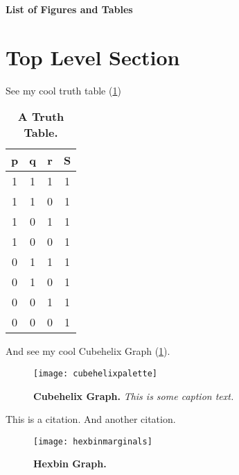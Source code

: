 \documentclass[12pt]{article}
\makeatletter
\newcommand \Dotfill {\leavevmode \cleaders \hb@xt@ .8em{\hss .\hss }\hfill \kern \z@}
\newcommand{\titlepagefigure}{Title Page Figure}
\newif\iftitlefigure
\makeatother
\begin{document}
\begin{center}
{\fontsize{18pt}{24pt}\bfseries List of Figures and Tables}
\end{center}
\iftitlefigure
	{\hspace{6mm}\fontsize{14pt}{15pt}\hyperref[fig:titlepage]{Figure \thefigure. \titlepagefigure} \Dotfill Title Page}
\fi

\listoffigures
\listoftables
\clearpage

\setcounter{page}{1}

\section{Top Level Section}
\blindmathtrue
\blindtext

See my cool truth table (\ref{tab:truthy})

\begin{table} [h!]
\caption[Table \thetable. Truth Table]{ \textbf{A Truth Table.} } 
\begin{tabular} {c c c | c}
p & q & r & S\\ \hline
1 & 1 & 1 & 1\\
1 & 1 & 0 & 1\\
1 & 0 & 1 & 1\\
1 & 0 & 0 & 1\\
0 & 1 & 1 & 1\\
0 & 1 & 0 & 1\\
0 & 0 & 1 & 1\\
0 & 0 & 0 & 1\\
\end{tabular}
\label{tab:truthy}
\end{table}

\blindtext

And see my cool Cubehelix Graph (\ref{fig:cubehelix}).

\begin{figure}[!ht]
	\texttt{[image: cubehelixpalette]}
	\caption[Figure \thefigure. Cubehelix Graph]{ \textbf{Cubehelix Graph.} \textit{This is some caption text.}}
	\label{fig:cubehelix}
\end{figure}

This is a citation\cite[chapter, p.~15]{greenwade93}.
And another citation\cite{goossens93}.

\begin{figure}[!ht]
	\texttt{[image: hexbinmarginals]}
	\caption[Figure \thefigure. Hexbin Marginal Graph]{ \textbf{Hexbin Graph.} }
	\label{fig:hexbin}
\end{figure}
\end{document}
